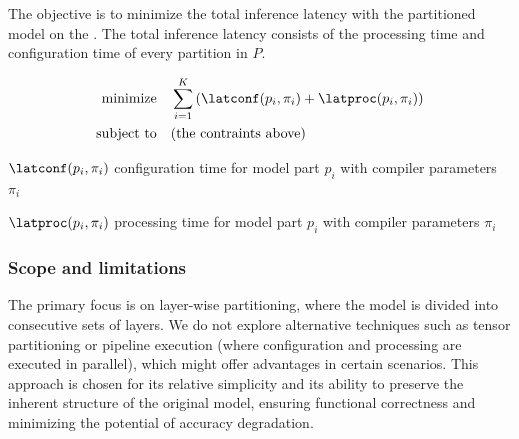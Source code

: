 \begin{description}
\end{description}

The objective is to minimize the total inference latency with the partitioned model on the \graicore{}.
The total inference latency consists of the processing time and configuration time of every partition in $P$.

\begin{align*}
    \textrm{minimize} & \quad \sum_{i=1}^{K} \left( \latconf(p_i, \pi_i) + \latproc(p_i, \pi_i) \right) \\
    \textrm{subject to} & \quad \textrm{(the contraints above)}
\end{align*}

\begin{eqexpl}[30mm]
    \item{$\latconf(p_i, \pi_i)$} configuration time for model part $p_i$ with compiler parameters $\pi_i$
    \item{$\latproc(p_i, \pi_i)$} processing time for model part $p_i$ with compiler parameters $\pi_i$
\end{eqexpl}

\subsubsection{Scope and limitations}
The primary focus is on layer-wise partitioning, where the model is divided into consecutive sets of layers.
We do not explore alternative techniques such as tensor partitioning or pipeline execution (where configuration and processing are executed in parallel), which might offer advantages in certain scenarios.
This approach is chosen for its relative simplicity and its ability to preserve the inherent structure of the original model, ensuring functional correctness and minimizing the potential of accuracy degradation.


